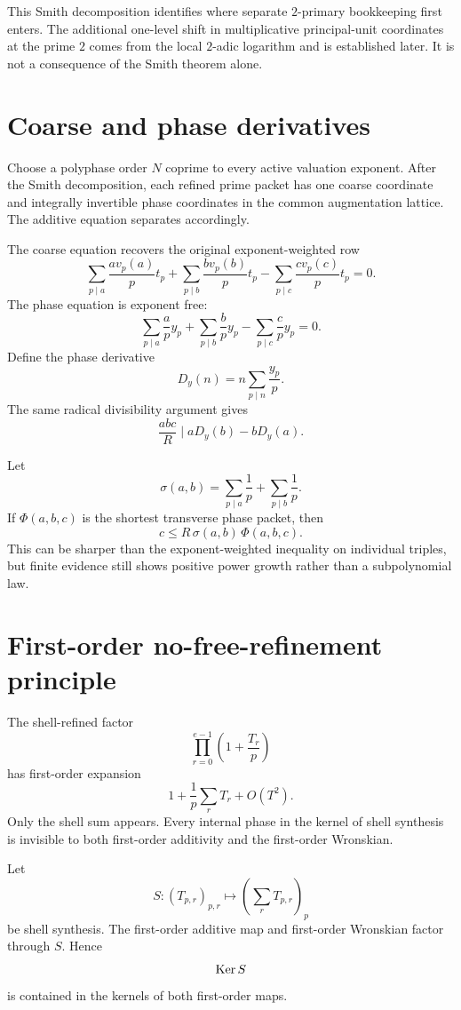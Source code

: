 This Smith decomposition identifies where separate $2$-primary bookkeeping first enters. The additional one-level shift in multiplicative principal-unit coordinates at the prime $2$ comes from the local $2$-adic logarithm and is established later. It is not a consequence of the Smith theorem alone.

\section{Coarse and phase derivatives}
Choose a polyphase order $N$ coprime to every active valuation exponent. After the Smith decomposition, each refined prime packet has one coarse coordinate and integrally invertible phase coordinates in the common augmentation lattice. The additive equation separates accordingly.

The coarse equation recovers the original exponent-weighted row
\[
 \sum_{p\mid a}\frac{av_p(a)}p t_p
 +
 \sum_{p\mid b}\frac{bv_p(b)}p t_p
 -
 \sum_{p\mid c}\frac{cv_p(c)}p t_p
 =0.
\]
The phase equation is exponent free:
\[
 \boxed{
 \sum_{p\mid a}\frac ap y_p
 +
 \sum_{p\mid b}\frac bp y_p
 -
 \sum_{p\mid c}\frac cp y_p
 =0.
 }
\]
Define the phase derivative
\[
 D_y(n)=n\sum_{p\mid n}\frac{y_p}{p}.
\]
The same radical divisibility argument gives
\[
 \frac{abc}{R}\mid aD_y(b)-bD_y(a).
\]

Let
\[
 \sigma(a,b)
 =
 \sum_{p\mid a}\frac1p
 +
 \sum_{p\mid b}\frac1p.
\]
If $\Phi(a,b,c)$ is the shortest transverse phase packet, then
\[
 \boxed{
 c
 \le
 R\,\sigma(a,b)\,\Phi(a,b,c).
 }
\]
This can be sharper than the exponent-weighted inequality on individual triples, but finite evidence still shows positive power growth rather than a subpolynomial law.

\section{First-order no-free-refinement principle}
The shell-refined factor
\[
 \prod_{r=0}^{e-1}
 \left(1+\frac{T_r}{p}\right)
\]
has first-order expansion
\[
 1+\frac1p\sum_rT_r+O(T^2).
\]
Only the shell sum appears. Every internal phase in the kernel of shell synthesis is invisible to both first-order additivity and the first-order Wronskian.

\begin{theorem}
Let
\[
 S:(T_{p,r})_{p,r}\longmapsto
 \left(\sum_rT_{p,r}\right)_p
\]
be shell synthesis. The first-order additive map and first-order Wronskian factor through $S$. Hence
\[
 \operatorname{Ker} S
\]
is contained in the kernels of both first-order maps.
\end{theorem}

